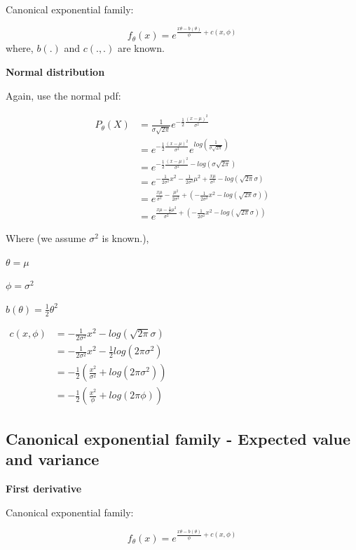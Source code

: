 \documentclass[]{book}
\begin{document}
Canonical exponential family:

\[f_{\theta}(x)=e^{\frac{x\theta-b(\theta)}{\phi}+c(x,\phi)}\]
where, \(b(.)\) and \(c(.,.)\) are known.

\textbf{Normal distribution}

Again, use the normal pdf:

\[\begin{aligned} P_{\theta}(X) &= \frac{1}{\sigma\sqrt{2\pi}} e^{-\frac{1}{2}\frac{(x-\mu)^2}{\sigma^2}}\\ &=e^{-\frac{1}{2}\frac{(x-\mu)^2}{\sigma^2}} e^{log(\frac{1}{\sigma\sqrt{2\pi}})} \\ &= e^{-\frac{1}{2}\frac{(x-\mu)^2}{\sigma^2}-log (\sigma\sqrt{2\pi})} \\ &= e^{-\frac{1}{2\sigma^2}x^2-\frac{1}{2\sigma^2} \mu^2+\frac{x\mu}{\sigma^2}-log(\sqrt{2\pi}\sigma)}\\ &= e^{\frac{x\mu}{\sigma^2}-\frac{\mu^2}{2\sigma^2}+(-\frac{1}{2\sigma^2}x^2-log(\sqrt{2\pi}\sigma)) } \\ &=e^{\frac{x\mu-\frac{1}{2}\mu^2}{\sigma^2}+(-\frac{1}{2\sigma^2}x^2-log(\sqrt{2\pi}\sigma)) } \end{aligned}\]

Where (we assume \(\sigma^2\) is known.),

\(\theta=\mu\)

\(\phi =\sigma^2\)

\(b(\theta)=\frac{1}{2}\theta^2\)

\(\begin{aligned} c(x, \phi) &=-\frac{1}{2\sigma^2}x^2-log(\sqrt{2\pi}\sigma) \\ &=-\frac{1}{2\sigma^2}x^2-\frac{1}{2}log(2\pi\sigma^2) \\ &=-\frac{1}{2}(\frac{x^2}{\sigma^2}+log(2\pi\sigma^2)) \\ &=-\frac{1}{2}(\frac{x^2}{\phi}+log(2\pi \phi)) \end{aligned}\)

\hypertarget{canonical-exponential-family---expected-value-and-variance}{%
\subsection{Canonical exponential family - Expected value and variance}\label{canonical-exponential-family---expected-value-and-variance}}

\textbf{First derivative}

Canonical exponential family:

\[f_{\theta}(x)=e^{\frac{x\theta-b(\theta)}{\phi}+c(x,\phi)}\]
\end{document}
